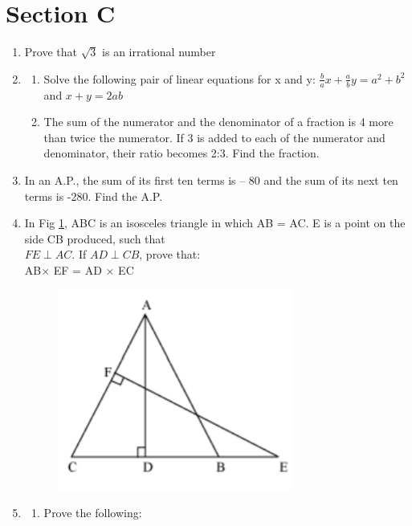 \documentclass[journal,12pt,twocolumn]{IEEEtran}
\renewcommand\thesection{\arabic{section}}
\begin{document}
\section{Section C}
\renewcommand{\theequation}{\theenumi}
\begin{enumerate}[label=\thesection.\arabic*.,ref=\thesection.\theenumi]
\item Prove that $\sqrt3$ is an irrational number \\
\item \begin{enumerate}
\item Solve the following pair of linear equations for x and y: $\frac{b}{a}x+\frac{a}{b}y=a^2+b^2$ and $x+y=2ab$ \\
\item The sum of the numerator and the denominator of a fraction is 4 more than twice the numerator. If 3 is added to each of the numerator and denominator, their ratio becomes 2:3. Find the fraction. \\
\end{enumerate}
\item In an A.P., the sum of its first ten terms is – 80 and the sum of its next ten terms is -280. Find the A.P. \\
\item  In Fig \ref{fig4}, ABC is an isosceles triangle in which AB = AC. E is a point on the side CB produced, such that \\ $FE \perp AC$. If $AD \perp CB$, prove that: \\ AB$\times$ EF = AD $\times$ EC
\begin{figure}[h!]
    \centering
    \includegraphics[width=0.5\columnwidth,center]{./fig/4.png}
	\caption{}
	\label{fig4}
 \end{figure}
\item \begin{enumerate}
\item Prove the following:

\end{enumerate}
\end{enumerate}
\end{document}
